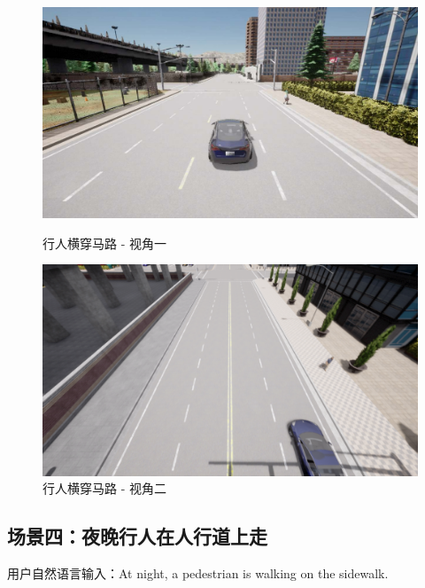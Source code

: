 \vspace{1em}

\begin{figure}[H]
	\centering
	\begin{minipage}[t]{0.48\textwidth}
		\centering
		\includegraphics[width=\linewidth]{"images/场景10.pdf"}
		\caption{行人横穿马路 - 视角一}
		\label{fig:scene8_1}
	\end{minipage}%
	\hfill
	\begin{minipage}[t]{0.48\textwidth}
		\centering
		\includegraphics[width=\linewidth]{"images/场景8.1.png"}
		\caption{行人横穿马路 - 视角二}
		\label{fig:scene8_2}
	\end{minipage}
\end{figure}

\subsection{场景四：夜晚行人在人行道上走}
用户自然语言输入：\indent At night, a pedestrian is walking on the sidewalk.\\


